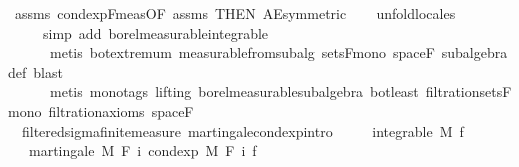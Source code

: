 \begin{isabellebody}
%
\isatagproof
{}\isamarkupfalse%
\ assms\ cond{\isacharunderscore}{\kern0pt}exp{\isacharunderscore}{\kern0pt}F{\isacharunderscore}{\kern0pt}meas{\isacharbrackleft}{\kern0pt}OF\ assms{\isacharparenleft}{\kern0pt}{}{\isacharparenright}{\kern0pt}{\isacharcomma}{\kern0pt}\ THEN\ AE{\isacharunderscore}{\kern0pt}symmetric{\isacharbrackright}{\kern0pt}\isanewline
\ \ \isamarkupfalse%
\ {\isacharparenleft}{\kern0pt}unfold{\isacharunderscore}{\kern0pt}locales{\isacharparenright}{\kern0pt}\isanewline
\ \ \ \ \ {\isacharparenleft}{\kern0pt}simp\ add{\isacharcolon}{\kern0pt}\ borel{\isacharunderscore}{\kern0pt}measurable{\isacharunderscore}{\kern0pt}integrable{\isacharcomma}{\kern0pt}\isanewline
\ \ \ \ \ \ metis\ bot{\isachardot}{\kern0pt}extremum\ measurable{\isacharunderscore}{\kern0pt}from{\isacharunderscore}{\kern0pt}subalg\ sets{\isacharunderscore}{\kern0pt}F{\isacharunderscore}{\kern0pt}mono\ space{\isacharunderscore}{\kern0pt}F\ subalgebra{\isacharunderscore}{\kern0pt}def{\isacharcomma}{\kern0pt}\ blast{\isacharcomma}{\kern0pt}\isanewline
\ \ \ \ \ \ metis\ {\isacharparenleft}{\kern0pt}mono{\isacharunderscore}{\kern0pt}tags{\isacharcomma}{\kern0pt}\ lifting{\isacharparenright}{\kern0pt}\ borel{\isacharunderscore}{\kern0pt}measurable{\isacharunderscore}{\kern0pt}subalgebra\ bot{\isacharunderscore}{\kern0pt}least\ filtration{\isachardot}{\kern0pt}sets{\isacharunderscore}{\kern0pt}F{\isacharunderscore}{\kern0pt}mono\ filtration{\isacharunderscore}{\kern0pt}axioms\ space{\isacharunderscore}{\kern0pt}F{\isacharparenright}{\kern0pt}%
\endisatagproof
{\isafoldproof}%
%
\isadelimproof
\ \isanewline
%
\endisadelimproof
\isanewline
{}\isamarkupfalse%
\ {\isacharparenleft}{\kern0pt}\ filtered{\isacharunderscore}{\kern0pt}sigma{\isacharunderscore}{\kern0pt}finite{\isacharunderscore}{\kern0pt}measure{\isacharparenright}{\kern0pt}\ martingale{\isacharunderscore}{\kern0pt}cond{\isacharunderscore}{\kern0pt}exp{\isacharbrackleft}{\kern0pt}intro{\isacharbrackright}{\kern0pt}{\isacharcolon}{\kern0pt}\ \ \isanewline
\ \ \ {\isachardoublequoteopen}integrable\ M\ f{\isachardoublequoteclose}\isanewline
\ \ \ {\isachardoublequoteopen}martingale\ M\ F\ {\isacharparenleft}{\kern0pt}{\isasymlambda}i{\isachardot}{\kern0pt}\ cond{\isacharunderscore}{\kern0pt}exp\ M\ {\isacharparenleft}{\kern0pt}F\ i{\isacharparenright}{\kern0pt}\ f{\isacharparenright}{\kern0pt}{\isachardoublequoteclose}\isanewline
%
\isadelimproof
\ \ %
\endisadelimproof
%
\isatagproof
{}\isamarkupfalse%

\end{isabellebody}
